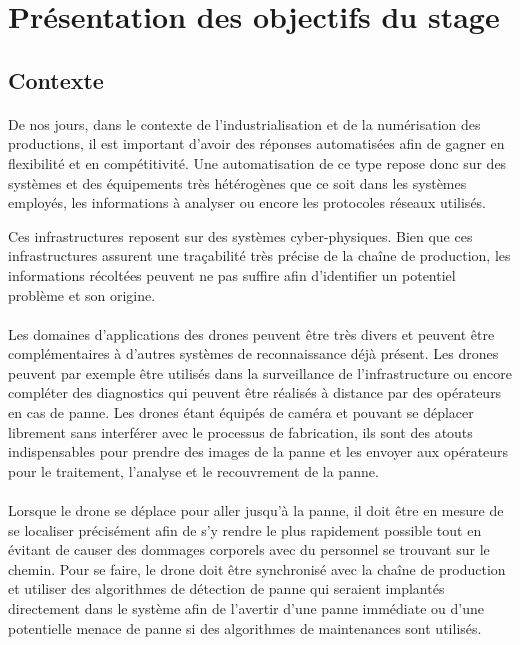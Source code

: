 \section{Présentation des objectifs du stage}
        \subsection{Contexte}
            \paragraph*{}
            De nos jours, dans le contexte de l'industrialisation et de la numérisation des productions, il est important d'avoir des réponses automatisées afin de gagner en flexibilité et en compétitivité. Une automatisation de ce type repose donc sur des systèmes et des équipements très hétérogènes que ce soit dans les systèmes employés, les informations à analyser ou encore les protocoles réseaux utilisés.
            
            Ces infrastructures reposent sur des systèmes cyber-physiques. Bien que ces infrastructures assurent une traçabilité très précise de la chaîne de production, les informations récoltées peuvent ne pas suffire afin d'identifier un potentiel problème et son origine.
            
            \paragraph*{}
            Les domaines d'applications des drones peuvent être très divers et peuvent être complémentaires à d'autres systèmes de reconnaissance déjà présent. Les drones peuvent par exemple être utilisés dans la surveillance de l'infrastructure ou encore compléter des diagnostics qui peuvent être réalisés à distance par des opérateurs en cas de panne. Les drones étant équipés de caméra et pouvant se déplacer librement sans interférer avec le processus de fabrication, ils sont des atouts indispensables pour prendre des images de la panne et les envoyer aux opérateurs pour le traitement, l'analyse et le recouvrement de la panne.
            
            \paragraph*{}
            Lorsque le drone se déplace pour aller jusqu'à la panne, il doit être en mesure de se localiser précisément afin de s'y rendre le plus rapidement possible tout en évitant de causer des dommages corporels avec du personnel se trouvant sur le chemin. Pour se faire, le drone doit être synchronisé avec la chaîne de production et utiliser des algorithmes de détection de panne qui seraient implantés directement dans le système afin de l'avertir d'une panne immédiate ou d'une potentielle menace de panne si des algorithmes de maintenances sont utilisés.
            
